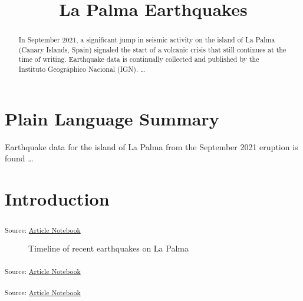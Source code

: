 \documentclass[
]{agujournal2019}
\begin{document}
\title{La Palma Earthquakes}



\begin{abstract}
In September 2021, a significant jump in seismic activity on the island
of La Palma (Canary Islands, Spain) signaled the start of a volcanic
crisis that still continues at the time of writing. Earthquake data is
continually collected and published by the Instituto Geográphico
Nacional (IGN). \ldots{}
\end{abstract}

\section*{Plain Language Summary}
Earthquake data for the island of La Palma from the September 2021
eruption is found \ldots{}




\section{Introduction}\label{introduction}

\textsubscript{Source:
\href{https://ehealy19.github.io/Matching_Movies_Manuscript/index.qmd.html}{Article
Notebook}}

\begin{figure}[H]


\caption{\label{fig-timeline}Timeline of recent earthquakes on La Palma}

\end{figure}%

\textsubscript{Source:
\href{https://ehealy19.github.io/Matching_Movies_Manuscript/index.qmd.html}{Article
Notebook}}

\textsubscript{Source:
\href{https://ehealy19.github.io/Matching_Movies_Manuscript/index.qmd.html}{Article
Notebook}}
\end{document}
